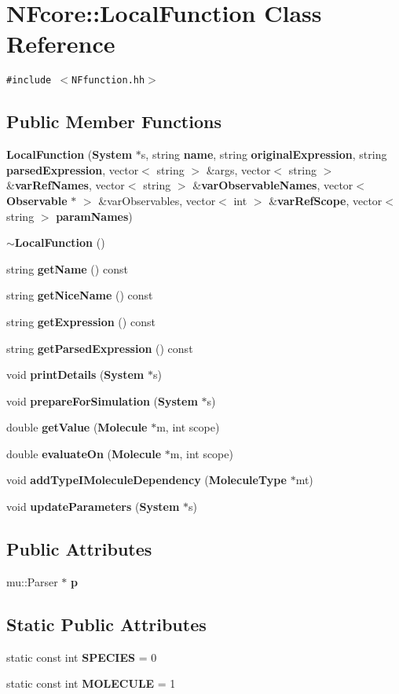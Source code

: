\section{NFcore::LocalFunction Class Reference}
\label{classNFcore_1_1LocalFunction}
{\tt \#include $<$NFfunction.hh$>$}

\subsection*{Public Member Functions}
\begin{CompactItemize}
\item 
{\bf LocalFunction} ({\bf System} $\ast$s, string {\bf name}, string {\bf originalExpression}, string {\bf parsedExpression}, vector$<$ string $>$ \&args, vector$<$ string $>$ \&{\bf varRefNames}, vector$<$ string $>$ \&{\bf varObservableNames}, vector$<$ {\bf Observable} $\ast$ $>$ \&varObservables, vector$<$ int $>$ \&{\bf varRefScope}, vector$<$ string $>$ {\bf paramNames})
\item 
{\bf $\sim$LocalFunction} ()
\item 
string {\bf getName} () const 
\item 
string {\bf getNiceName} () const 
\item 
string {\bf getExpression} () const 
\item 
string {\bf getParsedExpression} () const 
\item 
void {\bf printDetails} ({\bf System} $\ast$s)
\item 
void {\bf prepareForSimulation} ({\bf System} $\ast$s)
\item 
double {\bf getValue} ({\bf Molecule} $\ast$m, int scope)
\item 
double {\bf evaluateOn} ({\bf Molecule} $\ast$m, int scope)
\item 
void {\bf addTypeIMoleculeDependency} ({\bf MoleculeType} $\ast$mt)
\item 
void {\bf updateParameters} ({\bf System} $\ast$s)
\end{CompactItemize}
\subsection*{Public Attributes}
\begin{CompactItemize}
\item 
mu::Parser $\ast$ {\bf p}
\end{CompactItemize}
\subsection*{Static Public Attributes}
\begin{CompactItemize}
\item 
static const int {\bf SPECIES} = 0
\item 
static const int {\bf MOLECULE} = 1
\end{CompactItemize}
